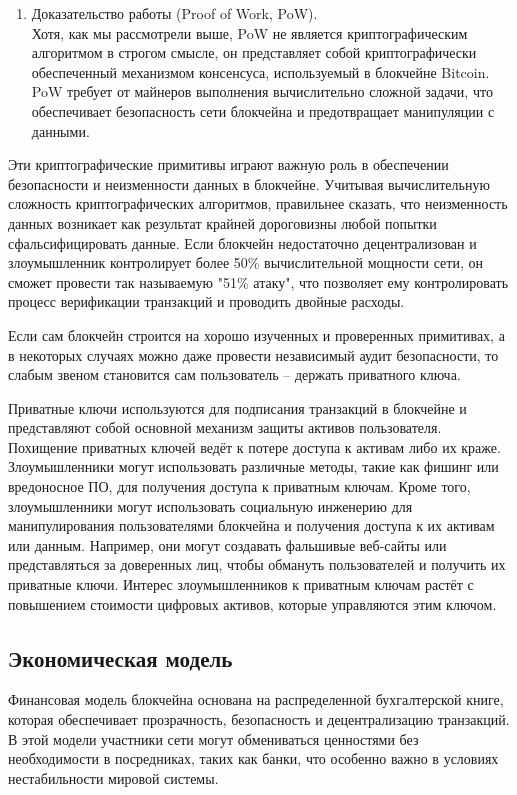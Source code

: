 \begin{enumerate}
	\item Доказательство работы (Proof of Work, PoW).\\ Хотя, как мы рассмотрели выше, PoW не является криптографическим алгоритмом в строгом смысле, он представляет собой криптографически обеспеченный механизмом консенсуса, используемый в блокчейне Bitcoin. PoW требует от майнеров выполнения вычислительно сложной задачи, что обеспечивает безопасность сети блокчейна и предотвращает манипуляции с данными.
\end{enumerate}

Эти криптографические примитивы играют важную роль в обеспечении безопасности и неизменности данных в блокчейне. Учитывая вычислительную сложность криптографических алгоритмов, правильнее сказать, что неизменность данных возникает как результат крайней дороговизны любой попытки сфальсифицировать данные\cite{label10}. Если блокчейн недостаточно децентрализован и злоумышленник контролирует более 50\% вычислительной мощности сети, он сможет провести так называемую "51\% атаку", что позволяет ему контролировать процесс верификации транзакций и проводить двойные расходы.

Если сам блокчейн строится на хорошо изученных и проверенных примитивах, а в некоторых случаях можно даже провести независимый аудит безопасности, то слабым звеном становится сам пользователь -- держать приватного ключа.

Приватные ключи используются для подписания транзакций в блокчейне и представляют собой основной механизм защиты активов пользователя. Похищение приватных ключей ведёт к потере доступа к активам либо их краже. Злоумышленники могут использовать различные методы, такие как фишинг или вредоносное ПО, для получения доступа к приватным ключам. Кроме того, злоумышленники могут использовать социальную инженерию для манипулирования пользователями блокчейна и получения доступа к их активам или данным. Например, они могут создавать фальшивые веб-сайты или представляться за доверенных лиц, чтобы обмануть пользователей и получить их приватные ключи. Интерес злоумышленников к приватным ключам растёт с повышением стоимости цифровых активов, которые управляются этим ключом.

\subsection{Экономическая модель}

Финансовая модель блокчейна основана на распределенной бухгалтерской книге, которая обеспечивает прозрачность, безопасность и децентрализацию транзакций. В этой модели участники сети могут обмениваться ценностями без необходимости в посредниках, таких как банки, что особенно важно в условиях нестабильности мировой системы\cite{label37}.

